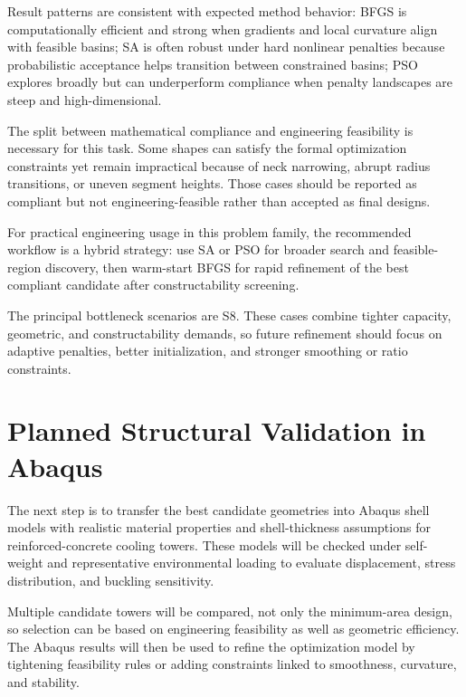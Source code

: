 Result patterns are consistent with expected method behavior: BFGS is computationally efficient and strong when gradients and local curvature align with feasible basins; SA is often robust under hard nonlinear penalties because probabilistic acceptance helps transition between constrained basins; PSO explores broadly but can underperform compliance when penalty landscapes are steep and high-dimensional.


The split between mathematical compliance and engineering feasibility is necessary for this task. Some shapes can satisfy the formal optimization constraints yet remain impractical because of neck narrowing, abrupt radius transitions, or uneven segment heights. Those cases should be reported as compliant but not engineering-feasible rather than accepted as final designs.


For practical engineering usage in this problem family, the recommended workflow is a hybrid strategy: use SA or PSO for broader search and feasible-region discovery, then warm-start BFGS for rapid refinement of the best compliant candidate after constructability screening.


The principal bottleneck scenarios are S8. These cases combine tighter capacity, geometric, and constructability demands, so future refinement should focus on adaptive penalties, better initialization, and stronger smoothing or ratio constraints.


\section{Planned Structural Validation in Abaqus}


The next step is to transfer the best candidate geometries into Abaqus shell models with realistic material properties and shell-thickness assumptions for reinforced-concrete cooling towers. These models will be checked under self-weight and representative environmental loading to evaluate displacement, stress distribution, and buckling sensitivity.


Multiple candidate towers will be compared, not only the minimum-area design, so selection can be based on engineering feasibility as well as geometric efficiency. The Abaqus results will then be used to refine the optimization model by tightening feasibility rules or adding constraints linked to smoothness, curvature, and stability.
